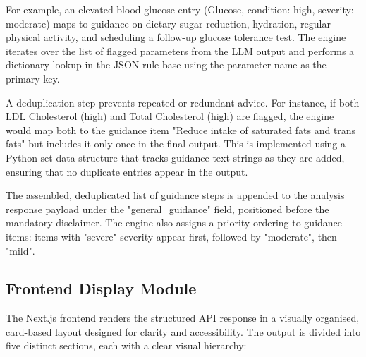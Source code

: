 For example, an elevated blood glucose entry (Glucose, condition: high, severity: moderate) maps to guidance on dietary sugar reduction, hydration, regular physical activity, and scheduling a follow-up glucose tolerance test. The engine iterates over the list of flagged parameters from the LLM output and performs a dictionary lookup in the JSON rule base using the parameter name as the primary key.

A deduplication step prevents repeated or redundant advice. For instance, if both LDL Cholesterol (high) and Total Cholesterol (high) are flagged, the engine would map both to the guidance item "Reduce intake of saturated fats and trans fats" but includes it only once in the final output. This is implemented using a Python set data structure that tracks guidance text strings as they are added, ensuring that no duplicate entries appear in the output.

The assembled, deduplicated list of guidance steps is appended to the analysis response payload under the "general\_guidance" field, positioned before the mandatory disclaimer. The engine also assigns a priority ordering to guidance items: items with "severe" severity appear first, followed by "moderate", then "mild".

\subsection{Frontend Display Module}
The Next.js frontend renders the structured API response in a visually organised, card-based layout designed for clarity and accessibility. The output is divided into five distinct sections, each with a clear visual hierarchy:

